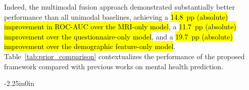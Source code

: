 \documentclass[10pt,letterpaper]{article}
\begin{document}
                                                                                                                          Indeed, the multimodal fusion approach demonstrated substantially better performance than all unimodal baselines, achieving a \hl{14.8~pp (absolute) improvement in ROC-AUC over the MRI-only model}, a \hl{11.7~pp (absolute) improvement over the questionnaire-only model}, and a \hl{19.7~pp (absolute) improvement over the demographic feature-only model}. Table~\ref{tab:prior_comparison} contextualizes the performance of the proposed framework compared with previous works on mental health prediction.

                                                                                                                          \begin{table}[!t]
                                                                                                                          \begin{adjustwidth}{-2.25in}{0in}
                                                                                                                          \centering
                                                                                                                          \caption{\textbf{Comparison with Prior Adolescent Mental Health Prediction Studies}}
                                                                                                                          \label{tab:prior_comparison}
                                                                                                                          \footnotesize
                                                                                                                          \renewcommand{\arraystretch}{1.15}


\end{adjustwidth}
\end{table}
\end{document}
